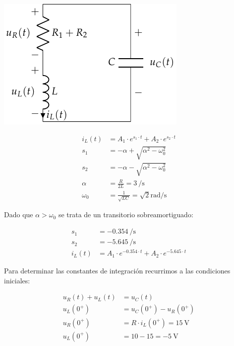 \documentclass[12pt]{article}
\begin{document}
\begin{minipage}{0.3\textwidth}
\includegraphics{figs/FM_4_8_natural}
\end{minipage}
\begin{minipage}{0.7\textwidth}
  \begin{align*}
    i_L(t) &= A_1 \cdot e^{s_1 \cdot t} + A_2 \cdot e^{s_2 \cdot t}\\
    s_1 &= -\alpha + \sqrt{\alpha^2 - \omega_0^2}\\
    s_2 &= -\alpha - \sqrt{\alpha^2 - \omega_0^2}\\
    \alpha &= \frac{R}{2L} = \SI{3}{\per\second}\\
    \omega_0 &= \frac{1}{\sqrt{LC}} = \sqrt{2}\si{\radian\per\second}
  \end{align*}
\end{minipage}

\bigskip

Dado que $\alpha > \omega_0$ se trata de un transitorio sobreamortiguado:

\begin{align*}
  s_1 &= \SI{-0.354}{\per\second}\\
  s_2 &= \SI{-5.645}{\per\second}\\
  i_L(t) &= A_1 \cdot e^{-0.354 \cdot t} + A_2 \cdot e^{-5.645 \cdot t}
\end{align*}

Para determinar las constantes de integración recurrimos a las condiciones iniciales:

\begin{align*}
  u_R(t) + u_L(t) &= u_C(t)\\
  u_L(0^+) &= u_C(0^+) - u_R(0^+)\\
  u_R(0^+) &= R \cdot i_L(0^+) = \SI{15}{\volt}\\
  u_L(0^+) &= 10 - 15 = \SI{-5}{\volt}
\end{align*}
\end{document}
